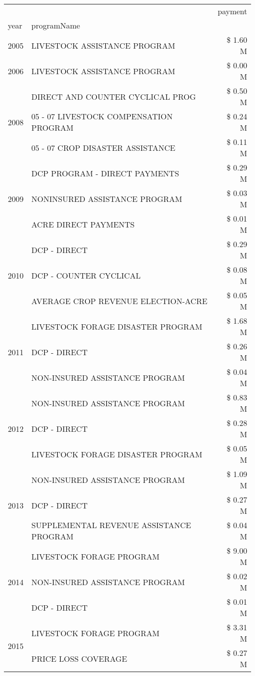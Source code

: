 \begin{tabular}{llr}
\toprule
 &  & payment \\
year & programName &  \\
\midrule
2005 & LIVESTOCK ASSISTANCE PROGRAM & \$ 1.60 M \\
\cline{1-3}
2006 & LIVESTOCK ASSISTANCE PROGRAM & \$ 0.00 M \\
\cline{1-3}
\multirow[t]{3}{*}{2008} & DIRECT AND COUNTER CYCLICAL PROG & \$ 0.50 M \\
 & 05 - 07 LIVESTOCK COMPENSATION PROGRAM & \$ 0.24 M \\
 & 05 - 07 CROP DISASTER ASSISTANCE & \$ 0.11 M \\
\cline{1-3}
\multirow[t]{3}{*}{2009} & DCP PROGRAM - DIRECT PAYMENTS & \$ 0.29 M \\
 & NONINSURED ASSISTANCE PROGRAM & \$ 0.03 M \\
 & ACRE DIRECT PAYMENTS & \$ 0.01 M \\
\cline{1-3}
\multirow[t]{3}{*}{2010} & DCP - DIRECT & \$ 0.29 M \\
 & DCP - COUNTER CYCLICAL & \$ 0.08 M \\
 & AVERAGE CROP REVENUE ELECTION-ACRE & \$ 0.05 M \\
\cline{1-3}
\multirow[t]{3}{*}{2011} & LIVESTOCK FORAGE DISASTER PROGRAM & \$ 1.68 M \\
 & DCP - DIRECT & \$ 0.26 M \\
 & NON-INSURED ASSISTANCE PROGRAM & \$ 0.04 M \\
\cline{1-3}
\multirow[t]{3}{*}{2012} & NON-INSURED ASSISTANCE PROGRAM & \$ 0.83 M \\
 & DCP - DIRECT & \$ 0.28 M \\
 & LIVESTOCK FORAGE DISASTER PROGRAM & \$ 0.05 M \\
\cline{1-3}
\multirow[t]{3}{*}{2013} & NON-INSURED ASSISTANCE PROGRAM & \$ 1.09 M \\
 & DCP - DIRECT & \$ 0.27 M \\
 & SUPPLEMENTAL REVENUE ASSISTANCE PROGRAM & \$ 0.04 M \\
\cline{1-3}
\multirow[t]{3}{*}{2014} & LIVESTOCK FORAGE PROGRAM & \$ 9.00 M \\
 & NON-INSURED ASSISTANCE PROGRAM & \$ 0.02 M \\
 & DCP - DIRECT & \$ 0.01 M \\
\cline{1-3}
\multirow[t]{3}{*}{2015} & LIVESTOCK FORAGE PROGRAM & \$ 3.31 M \\
 & PRICE LOSS COVERAGE & \$ 0.27 M \\

\end{tabular}
